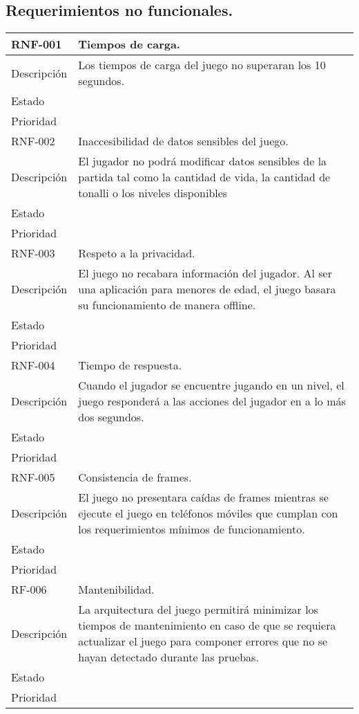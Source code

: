 \subsection{Requerimientos no funcionales.}
	\begin{longtable}[c]{ | m{5cm} | m{10cm}|} 
		\hline
		\rowcolor{cyan}RNF-001\label{RNF:01} & Tiempos de carga. \\ 
		\hline
		Descripción	& Los tiempos de carga del juego no superaran los 10 segundos. \\ 
		\hline
		Estado &  \\ 
		\hline
		Prioridad &  \\
		\hline
		\rowcolor{cyan}RNF-002\label{RNF:02} & Inaccesibilidad de datos sensibles del juego. \\ 
		\hline
		Descripción	& El jugador no podrá modificar datos sensibles de la partida tal como la cantidad de vida, la cantidad de tonalli o los niveles disponibles \\ 
		\hline
		Estado &  \\ 
		\hline
		Prioridad &  \\
		\hline
		\rowcolor{cyan}RNF-003\label{RNF:03} & Respeto a la privacidad.\\ 
		\hline
		Descripción	& El juego no recabara información del jugador. Al ser una aplicación para menores de edad, el juego basara su funcionamiento de manera offline.  \\ 
		\hline
		Estado &  \\ 
		\hline
		Prioridad &  \\
		\hline
		\rowcolor{cyan}RNF-004\label{RNF:04} & Tiempo de respuesta.\\ 
		\hline
		Descripción	& Cuando el jugador se encuentre jugando en un nivel, el juego responderá a las acciones del jugador en a lo más dos segundos.\\ 
		\hline
		Estado &  \\ 
		\hline
		Prioridad &  \\
		\hline
		\rowcolor{cyan}RNF-005\label{RNF:05} & Consistencia de frames. \\ 
		\hline
		Descripción	& El juego no presentara caídas de frames mientras se ejecute el juego en teléfonos móviles que cumplan con los requerimientos mínimos de funcionamiento. \\ 
		\hline
		Estado &  \\ 
		\hline
		Prioridad &  \\
		\hline
		\rowcolor{cyan}RF-006\label{RNF:06} & Mantenibilidad. \\ 
		\hline
		Descripción	& La arquitectura del juego permitirá minimizar los tiempos de mantenimiento en caso de que se requiera actualizar el juego para componer errores que no se hayan detectado durante las pruebas.\\ 
		\hline
		Estado &  \\ 
		\hline
		Prioridad &  \\
		\hline
		
	\end{longtable}